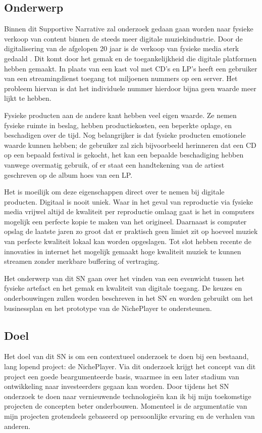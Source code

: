 \subsection{Onderwerp}
Binnen dit Supportive Narrative zal onderzoek gedaan gaan worden naar fysieke verkoop van content binnen de steeds meer digitale muziekindustrie. Door de digitalisering van de afgelopen 20 jaar is de verkoop van fysieke media sterk gedaald \cite{dong2022valueofmusic}. Dit komt door het gemak en de toegankelijkheid die digitale platformen hebben gemaakt. In plaats van een kast vol met CD's en LP's heeft een gebruiker van een streamingdienst toegang tot miljoenen nummers op een server. Het probleem hiervan is dat het individuele nummer hierdoor bijna geen waarde meer lijkt te hebben.

Fysieke producten aan de andere kant hebben veel eigen waarde. Ze nemen fysieke ruimte in beslag, hebben productiekosten, een beperkte oplage, en beschadigen over de tijd. Nog belangrijker is dat fysieke producten emotionele waarde kunnen hebben; de gebruiker zal zich bijvoorbeeld herinneren dat een CD op een bepaald festival is gekocht, het kan een bepaalde beschadiging hebben vanwege overmatig gebruik, of er staat een handtekening van de artiest geschreven op de album hoes van een LP.

Het is moeilijk om deze eigenschappen direct over te nemen bij digitale producten. Digitaal is nooit uniek. Waar in het geval van reproductie via fysieke media vrijwel altijd de kwaliteit per reproductie omlaag gaat is het in computers mogelijk een perfecte kopie te maken van het origineel. Daarnaast is computer opslag de laatste jaren zo groot dat er praktisch geen limiet zit op hoeveel muziek van perfecte kwaliteit lokaal kan worden opgeslagen. Tot slot hebben recente de innovaties in internet het mogelijk gemaakt hoge kwaliteit muziek te kunnen streamen zonder merkbare buffering of vertraging.

Het onderwerp van dit SN gaan over het vinden van een evenwicht tussen het fysieke artefact en het gemak en kwaliteit van digitale toegang. De keuzes en onderbouwingen zullen worden beschreven in het SN en worden gebruikt om het businessplan en het prototype van de NichePlayer te ondersteunen.

\subsection{Doel}
Het doel van dit SN is om een contextueel onderzoek te doen bij een bestaand, lang lopend project: de NichePlayer. Via dit onderzoek krijgt het concept van dit project een goede beargumenteerde basis, waarmee in een later stadium van ontwikkeling naar investeerders gegaan kan worden. Door tijdens het SN onderzoek te doen naar vernieuwende technologieën kan ik bij mijn toekomstige projecten de concepten beter onderbouwen. Momenteel is de argumentatie van mijn projecten grotendeels gebaseerd op persoonlijke ervaring en de verhalen van anderen.

